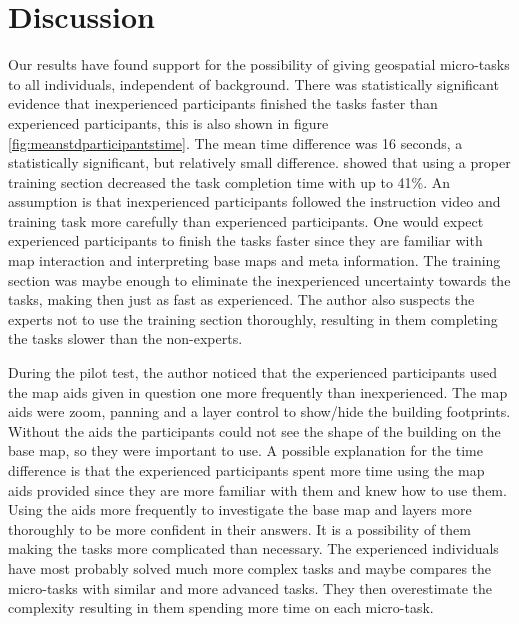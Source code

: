 \chapter{Discussion}
Our results have found support for the possibility of giving geospatial micro-tasks to all individuals, independent of background. There was statistically significant evidence that inexperienced participants finished the tasks faster than experienced participants, this is also shown in figure \ref{fig:meanstdparticipantstime}. The mean time difference was 16 seconds, a statistically significant, but relatively small difference. \cite{Gadiraju2015a} showed that using a proper training section decreased the task completion time with up to 41\%. An assumption is that inexperienced participants followed the instruction video and training task more carefully than experienced participants. One would expect experienced participants to finish the tasks faster since they are familiar with map interaction and interpreting base maps and meta information. The training section was maybe enough to eliminate the inexperienced uncertainty towards the tasks, making then just as fast as experienced. The author also suspects the experts not to use the training section thoroughly, resulting in them completing the tasks slower than the non-experts. 

During the pilot test, the author noticed that the experienced participants used the map aids given in question one more frequently than inexperienced. The map aids were zoom, panning and a layer control to show/hide the building footprints. Without the aids the participants could not see the shape of the building on the base map, so they were important to use. A possible explanation for the time difference is that the experienced participants spent more time using the map aids provided since they are more familiar with them and knew how to use them. Using the aids more frequently to investigate the base map and layers more thoroughly to be more confident in their answers. It is a possibility of them making the tasks more complicated than necessary. The experienced individuals have most probably solved much more complex tasks and maybe compares the micro-tasks with similar and more advanced tasks. They then overestimate the complexity resulting in them spending more time on each micro-task.

